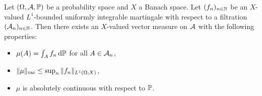 \begin{thm}\label{thm:martingale-measure}
  Let $(\Omega,\mc{A},\P)$ be a probability space and $X$ a Banach space.
  Let $(f_n)_{n \in \N}$ be an $X$-valued $L^1$-bounded uniformly integrable martingale with respect to a filtration $(\mc{A}_{n})_{n \in \N}$.
  Then there exists an $X$-valued vector measure on $\mc{A}$ with the following properties:
  \begin{itemize}
  \item $\mu(A) = \int_{A} f_n \, \dd\P$ for all $A \in \mc{A}_{n}$,
  \item $\|\mu\|_{\var} \leq \sup_{n} \|f_n\|_{L^1(\Omega;X)}$,
  \item $\mu$ is absolutely continuous with respect to $\P$.
  \end{itemize}
\end{thm}

